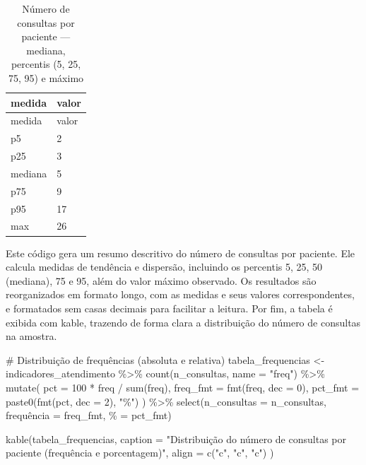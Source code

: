 \documentclass[
]{article}
\newenvironment{Shaded}{\begin{snugshade}}{\end{snugshade}}
\newcommand{\AttributeTok}[1]{\textcolor[rgb]{0.40,0.45,0.13}{#1}}
\newcommand{\CommentTok}[1]{\textcolor[rgb]{0.37,0.37,0.37}{#1}}
\newcommand{\DecValTok}[1]{\textcolor[rgb]{0.68,0.00,0.00}{#1}}
\newcommand{\FunctionTok}[1]{\textcolor[rgb]{0.28,0.35,0.67}{#1}}
\newcommand{\NormalTok}[1]{\textcolor[rgb]{0.00,0.23,0.31}{#1}}
\newcommand{\OtherTok}[1]{\textcolor[rgb]{0.00,0.23,0.31}{#1}}
\newcommand{\SpecialCharTok}[1]{\textcolor[rgb]{0.37,0.37,0.37}{#1}}
\newcommand{\StringTok}[1]{\textcolor[rgb]{0.13,0.47,0.30}{#1}}
\begin{document}
\begin{longtable}[]{@{}ll@{}}
\caption{Número de consultas por paciente --- mediana, percentis (5, 25,
75, 95) e máximo}\tabularnewline
\toprule\noalign{}
medida & valor \\
\midrule\noalign{}
\endfirsthead
\toprule\noalign{}
medida & valor \\
\midrule\noalign{}
\endhead
\bottomrule\noalign{}
\endlastfoot
p5 & 2 \\
p25 & 3 \\
mediana & 5 \\
p75 & 9 \\
p95 & 17 \\
max & 26 \\
\end{longtable}

Este código gera um resumo descritivo do número de consultas por
paciente. Ele calcula medidas de tendência e dispersão, incluindo os
percentis 5, 25, 50 (mediana), 75 e 95, além do valor máximo observado.
Os resultados são reorganizados em formato longo, com as medidas e seus
valores correspondentes, e formatados sem casas decimais para facilitar
a leitura. Por fim, a tabela é exibida com kable, trazendo de forma
clara a distribuição do número de consultas na amostra.

\begin{Shaded}
\begin{Highlighting}[]
\CommentTok{\# Distribuição de frequências (absoluta e relativa)}
\NormalTok{tabela\_frequencias }\OtherTok{\textless{}{-}}\NormalTok{ indicadores\_atendimento }\SpecialCharTok{\%\textgreater{}\%}
  \FunctionTok{count}\NormalTok{(n\_consultas, }\AttributeTok{name =} \StringTok{"freq"}\NormalTok{) }\SpecialCharTok{\%\textgreater{}\%}
  \FunctionTok{mutate}\NormalTok{(}
    \AttributeTok{pct =} \DecValTok{100} \SpecialCharTok{*}\NormalTok{ freq }\SpecialCharTok{/} \FunctionTok{sum}\NormalTok{(freq),}
    \AttributeTok{freq\_fmt =} \FunctionTok{fmt}\NormalTok{(freq, }\AttributeTok{dec =} \DecValTok{0}\NormalTok{),}
    \AttributeTok{pct\_fmt  =} \FunctionTok{paste0}\NormalTok{(}\FunctionTok{fmt}\NormalTok{(pct, }\AttributeTok{dec =} \DecValTok{2}\NormalTok{), }\StringTok{"\%"}\NormalTok{)}
\NormalTok{  ) }\SpecialCharTok{\%\textgreater{}\%}
  \FunctionTok{select}\NormalTok{(}\StringTok{\textasciigrave{}}\AttributeTok{n\_consultas}\StringTok{\textasciigrave{}} \OtherTok{=}\NormalTok{ n\_consultas,}
         \StringTok{\textasciigrave{}}\AttributeTok{frequência}\StringTok{\textasciigrave{}} \OtherTok{=}\NormalTok{ freq\_fmt,}
         \StringTok{\textasciigrave{}}\AttributeTok{\%}\StringTok{\textasciigrave{}} \OtherTok{=}\NormalTok{ pct\_fmt)}

\FunctionTok{kable}\NormalTok{(tabela\_frequencias,}
      \AttributeTok{caption =} \StringTok{"Distribuição do número de consultas por paciente (frequência e porcentagem)"}\NormalTok{,}
      \AttributeTok{align =} \FunctionTok{c}\NormalTok{(}\StringTok{"c"}\NormalTok{, }\StringTok{"c"}\NormalTok{, }\StringTok{"c"}\NormalTok{)}
\NormalTok{      )}
\end{Highlighting}
\end{Shaded}
\end{document}

